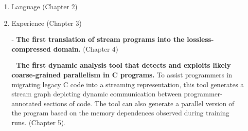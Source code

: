 \begin{enumerate}

\item Language (Chapter 2)

\item Experience (Chapter 3)

- {\bf The first translation of stream programs into the
  lossless-compressed domain.} (Chapter 4)

- {\bf The first dynamic analysis tool that detects and exploits
  likely coarse-grained parallelism in C programs.}  To assist
  programmers in migrating legacy C code into a streaming
  representation, this tool generates a stream graph depicting dynamic
  communication between programmer-annotated sections of code.  The
  tool can also generate a parallel version of the program based on
  the memory dependences observed during training runs.  (Chapter 5).

\end{enumerate}

